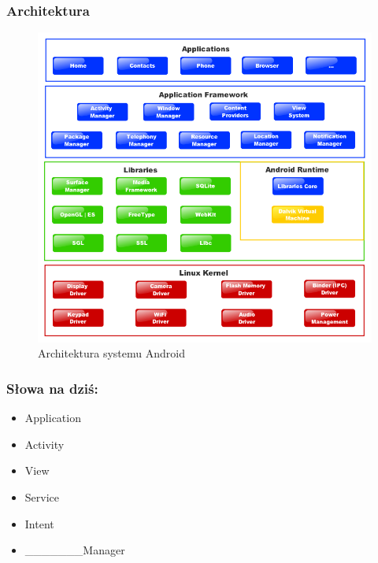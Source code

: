 \begin{frame}\frametitle{Architektura}

  \begin{figure}[t]
    \includegraphics[height=0.62\textheight,keepaspectratio=true,clip=true]{images/platform}
    \caption{Architektura systemu Android}
  \end{figure}

\end{frame}

\begin{frame}\frametitle{Słowa na dziś:}
 \begin{itemize}
  \item \Huge{Application}
  \item \Huge{Activity}
  \item \Huge{View}
  \item \Huge{Service}
  \item \Huge{Intent}
  \item \_\_\_\_\_\_\_\Huge{Manager}
 \end{itemize}
\end{frame}

